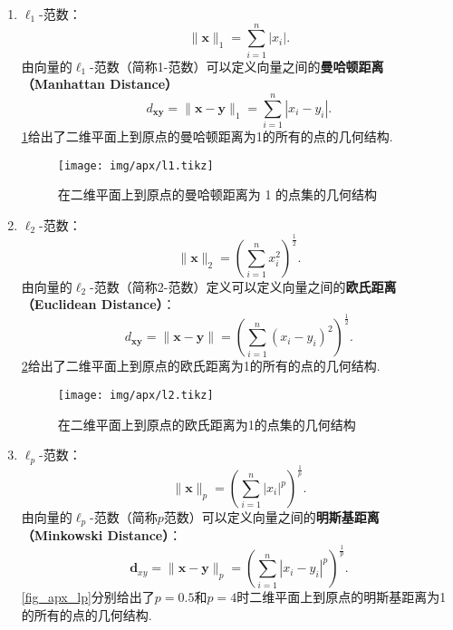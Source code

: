 \begin{enumerate}[leftmargin=0em, listparindent=2em, itemindent=2em]
    \item $\ell_1$-范数：
          \[
              \|\bm{x}\|_1 = \sum_{i=1}^n |x_i|.
          \]
          由向量的\( \ell_1 \)-范数（简称1-范数）可以定义向量之间的\textbf{曼哈顿距离（Manhattan Distance）}
          \[
              d_{\bm{x}\bm{y}} = \|\bm{x} - \bm{y}\|_1 = \sum_{i=1}^n |x_i - y_i|.
          \]
          \cref{fig_apx_l1}给出了二维平面上到原点的曼哈顿距离为1的所有的点的几何结构.
          \begin{figure}[htb!]
              \centering
              \texttt{[image: img/apx/l1.tikz]}
              \caption{在二维平面上到原点的曼哈顿距离为 1 的点集的几何结构}
              \label{fig_apx_l1}
          \end{figure}
    \item $\ell_2$-范数：
          \[
              \|\bm{x}\|_2 = \left(\sum_{i=1}^n x_i^2\right)^{\frac{1}{2}}.
          \]
          由向量的\( \ell_2 \)-范数（简称2-范数）定义可以定义向量之间的\textbf{欧氏距离（Euclidean Distance）}：
          \[
              d_{\bm{x}\bm{y}} = \|\bm{x} - \bm{y}\| = \left(\sum_{i=1}^{n}(x_i - y_i)^2\right)^{\frac{1}{2}}.
          \]
          \cref{fig_apx_l2}给出了二维平面上到原点的欧氏距离为1的所有的点的几何结构.
          \begin{figure}[htb!]
              \centering
              \texttt{[image: img/apx/l2.tikz]}
              \caption{在二维平面上到原点的欧氏距离为1的点集的几何结构}
              \label{fig_apx_l2}
          \end{figure}
    \item $\ell_p$-范数：
          \[
              \|\bm{x}\|_p = \left(\sum_{i=1}^n |x_i|^p\right)^{\frac{1}{p}}.
          \]
          由向量的$\ell_p$-范数（简称\( p \)范数）可以定义向量之间的\textbf{明斯基距离（Minkowski Distance）}：
          \[
              \bm{d}_{xy} = \|\bm{x} - \bm{y}\|_p = \left(\sum_{i=1}^n |x_i - y_i|^p\right)^{\frac{1}{p}}.
          \]
          \cref{fig_apx_lp}分别给出了$p = 0.5$和$p = 4$时二维平面上到原点的明斯基距离为1的所有的点的几何结构.


\end{enumerate}
